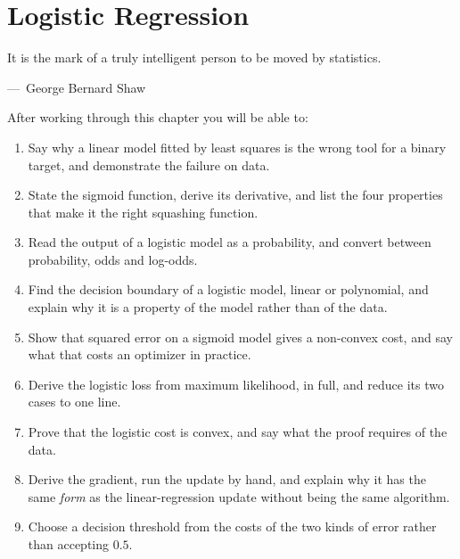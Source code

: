 
\chapter{Logistic Regression}
\label{ch:ch06}

\epigraph{It is the mark of a truly intelligent person to be moved by
statistics.}{---\ George Bernard Shaw}

\begin{chapterlearning}
After working through this chapter you will be able to:
\begin{enumerate}
  \item Say why a linear model fitted by least squares is the wrong tool for a
        binary target, and demonstrate the failure on data.
  \item State the sigmoid function, derive its derivative, and list the four
        properties that make it the right squashing function.
  \item Read the output of a logistic model as a probability, and convert
        between probability, odds and log-odds.
  \item Find the decision boundary of a logistic model, linear or polynomial,
        and explain why it is a property of the model rather than of the data.
  \item Show that squared error on a sigmoid model gives a non-convex cost, and
        say what that costs an optimizer in practice.
  \item Derive the logistic loss from maximum likelihood, in full, and reduce
        its two cases to one line.
  \item Prove that the logistic cost is convex, and say what the proof requires
        of the data.
  \item Derive the gradient, run the update by hand, and explain why it has the
        same \emph{form} as the linear-regression update without being the same
        algorithm.
  \item Choose a decision threshold from the costs of the two kinds of error
        rather than accepting $0.5$.
\end{enumerate}
\end{chapterlearning}

